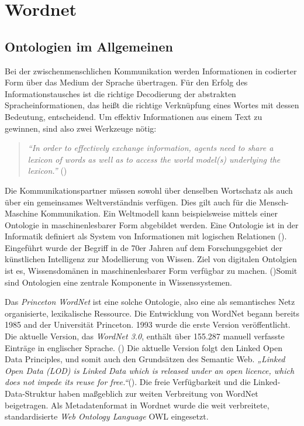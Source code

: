 \section{Wordnet}


\subsection{Ontologien im Allgemeinen}

Bei der zwischenmenschlichen Kommunikation werden Informationen in codierter Form über das Medium der Sprache übertragen. Für den Erfolg des Informationstausches ist die richtige Decodierung der abstrakten Spracheinformationen, das heißt die richtige Verknüpfung eines Wortes mit dessen Bedeutung, entscheidend. Um effektiv Informationen aus einem Text zu gewinnen, sind also zwei Werkzeuge nötig:
\begin{quote} \textit{"`In order to effectively exchange information, agents need to share a lexicon of words as well as to access the world model(s) underlying the lexicon."'} (\cite[vgl.][1]{OLTRAMANI})\end{quote} 

Die Kommunikationspartner müssen sowohl über denselben Wortschatz als auch über ein gemeinsames Weltverständnis verfügen. Dies gilt auch für die Mensch-Maschine Kommunikation. Ein Weltmodell kann beispielsweise mittels einer Ontologie in maschinenlesbarer Form abgebildet werden. Eine Ontologie ist in der Informatik definiert als System von Informationen mit logischen Relationen (\cite[vgl.][1]{DUDEN}). Eingeführt wurde der Begriff in de 70er Jahren auf dem Forschungsgebiet der künstlichen Intelligenz zur Modellierung von Wissen. Ziel von digitalen Ontolgien ist es, Wissensdomänen in maschinenlesbarer Form verfügbar zu machen. (\cite[vgl.][7]{TACKE})Somit sind Ontologien eine zentrale Komponente in Wissenssystemen. 

Das \textit{Princeton WordNet} ist eine solche Ontologie, also eine als semantisches Netz organisierte, lexikalische Ressource. Die Entwicklung von WordNet begann bereits 1985 and der Universität Princeton. 1993 wurde die erste Version veröffentlicht. Die aktuelle Version, das \textit{WordNet 3.0}, enthält über 155.287 manuell verfasste Einträge in englischer Sprache. (\cite[vgl.][1]{PRINCETON}) Die aktuelle Version folgt den Linked Open Data Principles, und somit auch den Grundsätzen des Semantic Web. \textit{„Linked Open Data (LOD) is Linked Data which is released under an open licence, which does not impede its reuse for free.“}(\cite[vgl.][1]{BERNERS_LEE}). Die freie Verfügbarkeit und die Linked-Data-Struktur haben maßgeblich zur weiten Verbreitung von WordNet beigetragen. Als Metadatenformat in Wordnet wurde die weit verbreitete, standardisierte \textit{Web Ontology Language} \ac{OWL} eingesetzt.

